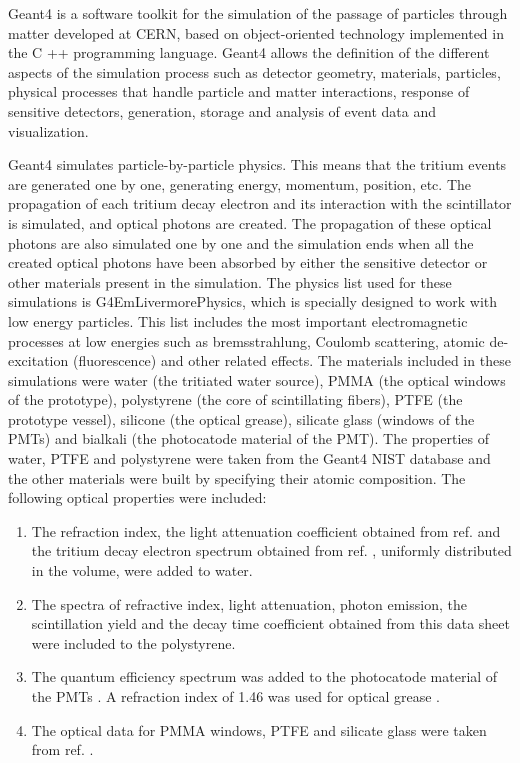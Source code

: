 Geant4 is a software toolkit for the simulation of the passage of particles through matter developed at CERN, based on object-oriented technology implemented in the C ++ programming language. Geant4 allows the definition of the different aspects of the simulation process such as detector geometry, materials, particles, physical processes that handle particle and matter interactions, response of sensitive detectors, generation, storage and analysis of event data and visualization.

Geant4 simulates particle-by-particle physics. This means that the tritium events are generated one by one, generating energy, momentum, position, etc. The propagation of each tritium decay electron and its interaction  with the scintillator is simulated, and optical photons are created. The propagation of these optical photons are also simulated one by one and the simulation ends when all the created optical photons have been absorbed by either the sensitive detector or other materials present in the simulation. The physics list used for these simulations is G4EmLivermorePhysics, which is specially designed to work with low energy particles. This list includes the most important electromagnetic processes at low energies such as bremsstrahlung, Coulomb scattering, atomic de-excitation (fluorescence) and other related effects. The materials included in these simulations were water (the tritiated water source), PMMA (the optical windows of the prototype), polystyrene (the core of scintillating fibers), PTFE (the prototype vessel), silicone (the optical grease), silicate glass (windows of the PMTs) and bialkali (the photocatode material of the PMT). The properties of water, PTFE and polystyrene were taken from the Geant4 NIST database and the other materials were built by specifying their atomic composition. The following optical properties were included:

\begin{enumerate}
%
\item{} The refraction index, the light attenuation coefficient obtained from ref. \cite{WaterPropertiesSimulation} and the tritium decay electron spectrum obtained from ref. \cite{TritiumEmissionSpectrum}, uniformly distributed in the volume, were added to water. 

\item{} The spectra of refractive index, light attenuation, photon emission, the scintillation yield and the decay time coefficient obtained from this data sheet \cite{DataSheetBCF12Fiber} were included to the polystyrene.

\item{} The quantum efficiency spectrum was added to the photocatode material of the PMTs \cite{DataSheetPMTs}. A refraction index of 1.46 was used for optical grease \cite{OpticalGrease}.

\item{} The optical data for PMMA windows, PTFE and silicate glass were taken from ref. \cite{NEMODataSimulation}.

\end{enumerate} 